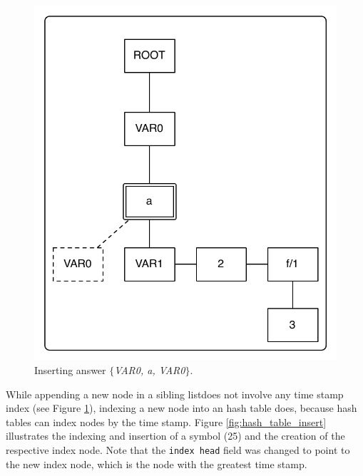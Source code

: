 \begin{figure}[ht]
  \centering
    \includegraphics[scale=0.45]{tst_insert.pdf}
  \caption{Inserting answer $\{$\textit{VAR0, a, VAR0}$\}$.}
  \label{fig:tst_chain_insert}
\end{figure}

While appending a new node in a sibling listdoes not involve any
time stamp index (see Figure \ref{fig:tst_chain_insert}), indexing a new node into an hash table does,
because hash tables can index nodes by the time stamp. Figure \ref{fig:hash_table_insert}
illustrates the indexing and insertion of a symbol (25) and the creation of the respective
index node. Note that the \texttt{index head} field was changed to point to the new index node, which
is the node with the greatest time stamp.

